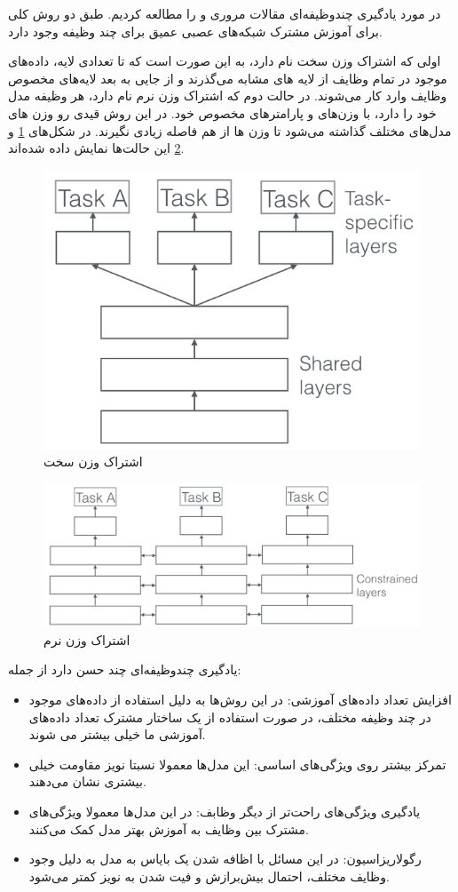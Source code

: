 \documentclass[12pt,a4paper]{report}
\begin{document}
در مورد یادگیری چندوظیفه‌ای مقالات مروری \cite{ruder2017overview} و \cite{zhang} را مطالعه کردیم.
طبق \cite{ruder2017overview} دو روش کلی برای آموزش مشترک شبکه‌های عصبی عمیق برای چند وظیفه وجود دارد.

اولی که اشتراک وزن سخت نام دارد، به این صورت است که تا تعدادی لایه، داده‌های موجود
در تمام وظایف از لایه های مشابه می‌گذرند و از جایی به بعد لایه‌های مخصوص وظایف وارد کار می‌شوند.
در حالت دوم که اشتراک وزن نرم نام دارد، هر وظیفه مدل خود را دارد، با وزن‌های و پارامترهای مخصوص خود.
در این روش قیدی رو وزن های مدل‌های مختلف گذاشته می‌شود تا وزن ها از هم فاصله زیادی نگیرند.
در شکل‌های \ref{joint_hard} و \ref{joint_soft} این حالت‌ها نمایش داده شده‌اند.
\begin{figure}[h]
  \centering
  \includegraphics[width=.5\textwidth]{Images//joint1.png}
  \caption{اشتراک وزن سخت}\label{joint_hard}
\end{figure}
\begin{figure}[h]
  \centering
  \includegraphics[width=.5\textwidth]{Images//joint2.png}
  \caption{اشتراک وزن نرم}\label{joint_soft}
\end{figure}

یادگیری چندوظیفه‌ای چند حسن دارد از جمله:
\begin{itemize}
  \item افزایش تعداد داده‌های آموزشی: در این روش‌ها به دلیل استفاده از داده‌های موجود در چند وظیفه مختلف، در صورت استفاده از یک ساختار مشترک تعداد داده‌های آموزشی ما خیلی بیشتر می شوند.
  \item تمرکز بیشتر روی ویژگی‌های اساسی: این مدل‌ها معمولا نسبتا نویز مقاومت خیلی بیشتری نشان می‌دهند.
  \item یادگیری ویژگی‌های راحت‌تر از دیگر وظابف: در این مدل‌ها معمولا ویژگی‌های مشترک بین وظایف به آموزش بهتر مدل کمک می‌کنند.
  \item رگولاریزاسیون: در این مسائل با اظافه شدن یک بایاس به مدل به دلیل وجود وظایف مختلف، احتمال
  بیش‌برازش و فیت شدن به نویز کمتر می‌شود.
\end{itemize}
\end{document}
